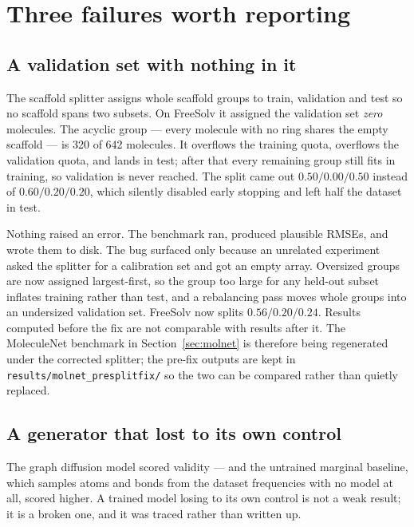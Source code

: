 \section{Three failures worth reporting}
\label{sec:negative}

\subsection{A validation set with nothing in it}

The scaffold splitter assigns whole scaffold groups to train, validation and test so
no scaffold spans two subsets. On FreeSolv it assigned the validation set
\emph{zero} molecules. The acyclic group --- every molecule with no ring shares the
empty scaffold --- is 320 of 642 molecules. It overflows the training quota,
overflows the validation quota, and lands in test; after that every remaining group
still fits in training, so validation is never reached. The split came out
$0.50 / 0.00 / 0.50$ instead of $0.60 / 0.20 / 0.20$, which silently disabled early
stopping and left half the dataset in test.

Nothing raised an error. The benchmark ran, produced plausible RMSEs, and wrote them
to disk. The bug surfaced only because an unrelated experiment asked the splitter for
a calibration set and got an empty array. Oversized groups are now assigned
largest-first, so the group too large for any held-out subset inflates training
rather than test, and a rebalancing pass moves whole groups into an undersized
validation set. FreeSolv now splits $0.56 / 0.20 / 0.24$. Results computed before the
fix are not comparable with results after it. The MoleculeNet benchmark in
Section~\ref{sec:molnet} is therefore being regenerated under the corrected
splitter; the pre-fix outputs are kept in \texttt{results/molnet\_presplitfix/} so
the two can be compared rather than quietly replaced.

\subsection{A generator that lost to its own control}

The graph diffusion model scored \genBaselineValidity{} validity --- and the
untrained marginal baseline, which samples atoms and bonds from the dataset
frequencies with no model at all, scored higher. A trained model losing to its own
control is not a weak result; it is a broken one, and it was traced rather than
written up.


